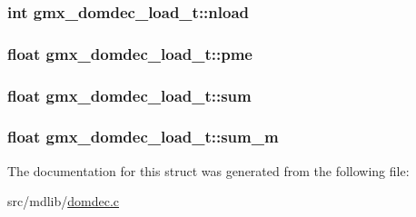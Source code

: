 \hypertarget{structgmx__domdec__load__t_a187c974d30fd3c5750041274c0c96990}{
\subsubsection[{nload}]{\setlength{\rightskip}{0pt plus 5cm}int {\bf gmx\-\_\-domdec\-\_\-load\-\_\-t\-::nload}}}\label{structgmx__domdec__load__t_a187c974d30fd3c5750041274c0c96990}
\hypertarget{structgmx__domdec__load__t_a5dc1a59c9ce645a9632a2c86bde0bd10}{
\subsubsection[{pme}]{\setlength{\rightskip}{0pt plus 5cm}float {\bf gmx\-\_\-domdec\-\_\-load\-\_\-t\-::pme}}}\label{structgmx__domdec__load__t_a5dc1a59c9ce645a9632a2c86bde0bd10}
\hypertarget{structgmx__domdec__load__t_a4dc5c6e755cc836394984384b1df4533}{
\subsubsection[{sum}]{\setlength{\rightskip}{0pt plus 5cm}float {\bf gmx\-\_\-domdec\-\_\-load\-\_\-t\-::sum}}}\label{structgmx__domdec__load__t_a4dc5c6e755cc836394984384b1df4533}
\hypertarget{structgmx__domdec__load__t_a3db0f70d8f90c70d8d5d1f60ddcff7ab}{
\subsubsection[{sum\-\_\-m}]{\setlength{\rightskip}{0pt plus 5cm}float {\bf gmx\-\_\-domdec\-\_\-load\-\_\-t\-::sum\-\_\-m}}}\label{structgmx__domdec__load__t_a3db0f70d8f90c70d8d5d1f60ddcff7ab}


\-The documentation for this struct was generated from the following file\-:\begin{DoxyCompactItemize}
\item 
src/mdlib/\hyperlink{domdec_8c}{domdec.\-c}\end{DoxyCompactItemize}

